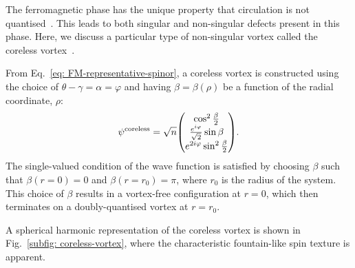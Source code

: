 The ferromagnetic phase has the unique property that circulation is not
quantised~\cite{Kawaguchi2012}.
This leads to both singular and non-singular defects present in this phase.
Here, we discuss a particular type of non-singular vortex called the coreless
vortex~\cite{Martikainen2002, Leanhardt2003}.

From Eq.~\eqref{eq: FM-representative-spinor}, a coreless vortex is constructed
using the choice of \(\theta-\gamma = \alpha= \varphi \) and having
\(\beta = \beta(\rho)\) be a function of the radial coordinate, \(\rho \):
\begin{equation}
    \psi^\mathrm{coreless} = \sqrt{n}\mqty(
    \cos^2\frac{\beta}{2} \\
    \frac{e^{i\varphi}}{\sqrt{2}}\sin\beta \\
    e^{2i\varphi}\sin^2\frac{\beta}{2}
    ).
\end{equation}
The single-valued condition of the wave function is satisfied by choosing
\(\beta \) such that \(\beta(r=0) = 0\) and \(\beta(r=r_0) = \pi \), where
\(r_0\) is the radius of the system.
This choice of \(\beta \) results in a vortex-free configuration at \(r=0\),
which then terminates on a doubly-quantised vortex at \(r=r_0\).

A spherical harmonic representation of the coreless vortex is shown in
Fig.~\ref{subfig: coreless-vortex}, where the characteristic fountain-like
spin texture is apparent.

